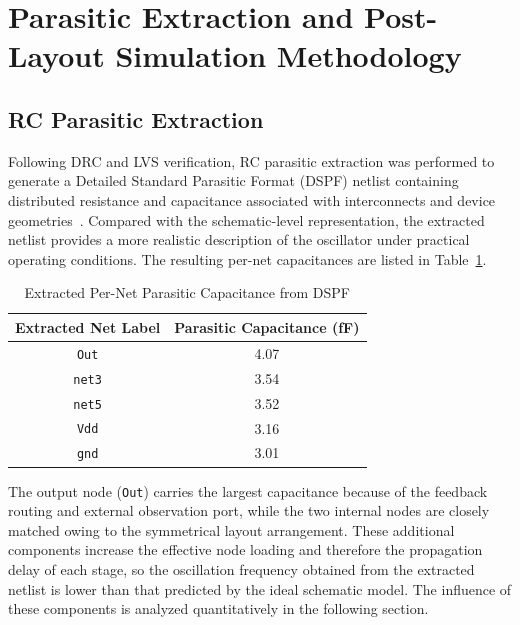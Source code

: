 \documentclass[conference,a4paper]{IEEEtran} %
\begin{document}
\section{Parasitic Extraction and Post-Layout Simulation Methodology}\label{sec:pex}

\subsection{RC Parasitic Extraction}
Following DRC and LVS verification, RC parasitic extraction was performed to
generate a Detailed Standard Parasitic Format (DSPF) netlist containing
distributed resistance and capacitance associated with interconnects and device
geometries~\cite{razavi_rf}. Compared with the schematic-level representation,
the extracted netlist provides a more realistic description of the oscillator
under practical operating conditions. The resulting per-net capacitances are
listed in Table~\ref{tab:parasitic_capacitance}.

\begin{table}[!b]
\caption{Extracted Per-Net Parasitic Capacitance from DSPF}
\label{tab:parasitic_capacitance}
\begin{center}
\begin{tabular}{cc}
\toprule
\textbf{Extracted Net Label} & \textbf{Parasitic Capacitance (fF)} \\
\midrule
\texttt{Out}  & 4.07 \\
\texttt{net3} & 3.54 \\
\texttt{net5} & 3.52 \\
\texttt{Vdd}  & 3.16 \\
\texttt{gnd}  & 3.01 \\
\bottomrule
\end{tabular}
\end{center}
\end{table}

The output node (\texttt{Out}) carries the largest capacitance because of the
feedback routing and external observation port, while the two internal nodes
are closely matched owing to the symmetrical layout arrangement. These
additional components increase the effective node loading and therefore the
propagation delay of each stage, so the oscillation frequency obtained from the
extracted netlist is lower than that predicted by the ideal schematic model.
The influence of these components is analyzed quantitatively in the following
section.
\end{document}
